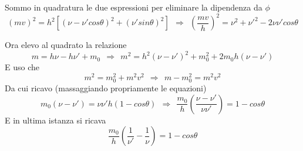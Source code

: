 \documentclass[twoside]{article}
\begin{document}
Sommo in quadratura le due espressioni per eliminare la dipendenza da $\phi$
\begin{equation}
    \left(mv\right)^2=h^2[(\nu - \nu'cos\theta)^2+(\nu'sin\theta)^2]     \ \ \Rightarrow \ \  \left(\frac{mv}{h}\right)^2=\nu^2 + \nu'^2 - 2\nu \nu' cos\theta
\end{equation}

Ora elevo al quadrato la relazione
\begin{equation}
    m=h\nu - h\nu' + m_0 \ \ \Rightarrow \ \ m^2=h^2(\nu - \nu')^2+m_0^2+2m_0 h(\nu - \nu') 
\end{equation}
E uso che 
\begin{equation}
    m^2=m_0^2 + m^2v^2 \ \ \Rightarrow \ \ m-m_0^2 =m^2 v^2
\end{equation}
Da cui ricavo (massaggiando propriamente le equazioni)
\begin{equation}
    m_0(\nu - \nu')=\nu \nu' h(1-cos\theta) \ \ \Rightarrow \ \ \frac{m_0}{h}\left( \frac{\nu - \nu'}{\nu \nu'} \right)=1-cos\theta
\end{equation}
E in ultima istanza si ricava
\begin{equation}
    \frac{m_0}{h}\left( \frac{1}{\nu'}-\frac{1}{\nu} \right)=1-cos\theta
\end{equation}
\end{document}
